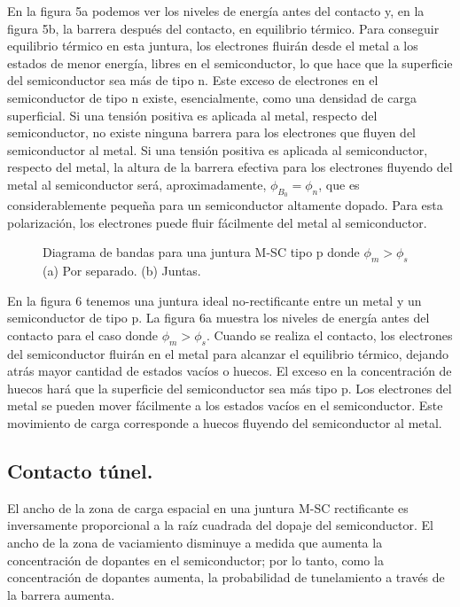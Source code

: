 \documentclass[12pt,a4paper]{article}
\begin{document}
En la figura 5a podemos ver los niveles de energía antes del contacto y, en la figura 5b, la barrera después del contacto, en equilibrio térmico. Para conseguir equilibrio térmico en esta juntura, los electrones fluirán desde el metal a los estados de menor energía, libres en el semiconductor, lo que hace que la superficie del semiconductor sea más de tipo n. Este exceso de electrones en el semiconductor de tipo n existe, esencialmente, como una densidad de carga superficial. Si una tensión positiva es aplicada al metal, respecto del semiconductor, no existe ninguna barrera para los electrones que fluyen del semiconductor al metal. Si una tensión positiva es aplicada al semiconductor, respecto del metal, la altura de la barrera efectiva para los electrones fluyendo del metal al semiconductor será, aproximadamente, $\phi _{B_{0}}=\phi _{n}$, que es considerablemente pequeña para un semiconductor altamente dopado. Para esta polarización, los electrones puede fluir fácilmente del metal al semiconductor.

\begin{figure}[ht!]
\begin{center}
\caption{Diagrama de bandas para una juntura M-SC tipo p donde $\phi _{m}> \phi _{s}$ (a) Por separado. (b) Juntas.}
\end{center}
\end{figure}

En la figura 6 tenemos una juntura ideal no-rectificante entre un metal y un semiconductor de tipo p. La figura 6a muestra los niveles de energía antes del contacto para el caso donde $\phi _{m}> \phi _{s}$. Cuando se realiza el contacto, los electrones del semiconductor fluirán en el metal para alcanzar el equilibrio térmico, dejando atrás mayor cantidad de estados vacíos o huecos. El exceso en la concentración de huecos hará que la superficie del semiconductor sea más tipo p. Los electrones del metal se pueden mover fácilmente a los estados vacíos en el semiconductor. Este movimiento de carga corresponde a huecos fluyendo del semiconductor al metal.

\subsection{Contacto túnel.}

El ancho de la zona de carga espacial en una juntura M-SC rectificante es inversamente proporcional a la raíz cuadrada del dopaje del semiconductor. El ancho de la zona de vaciamiento disminuye a medida que aumenta la concentración de dopantes en el semiconductor; por lo tanto, como la concentración de dopantes aumenta, la probabilidad de tunelamiento a través de la barrera aumenta.
\end{document}
